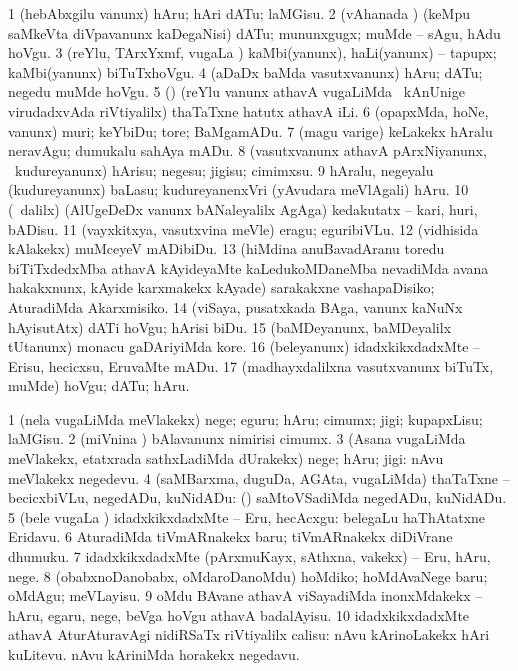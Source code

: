 \bentry
{}
\gl{\sakirx}
\bmng
\bnum
\num{1} (hebAbxgilu \mo vanunx) hAru; hAri dATu; laMGisu. 
\num{2} (vAhanada \vi) (keMpu saMkeVta diVpavanunx kaDegaNisi) dATu; mununxgugx; muMde -- sAgu, hAdu hoVgu. 
\num{3} (reYlu, TArxYxmf, \mo vugaLa \vi) kaMbi(yanunx), haLi(yanunx) -- tapupx; kaMbi(yanunx) biTuTxhoVgu. 
\num{4} (aDaDx baMda vasutxvanunx) hAru; dATu; negedu muMde hoVgu. 
\num{5} (\ame) (reYlu \mo vanunx athavA \mo vugaLiMda \kanmu\ kAnUnige virudadxvAda riVtiyalilx) thaTaTxne hatutx athavA iLi. 
\num{6} (opapxMda, hoNe, \mo vanunx) muri; keYbiDu; tore; BaMgamADu. 
\num{7} (magu \mo varige) keLakekx hAralu neravAgu; dumukalu sahAya mADu. 
\num{8} (vasutxvanunx athavA pArxNiyanunx, \kanmu\ kudureyanunx) hArisu; negesu; jigisu; cimimxsu. 
\num{9} hAralu, negeyalu (kudureyanunx) baLasu; kudureyanenxVri (yAvudara meVlAgali) hAru. 
\num{10} (\sA\ \BUkaq dalilx) (AlUgeDeDx \mo vanunx bANaleyalilx AgAga) kedakutatx -- kari, huri, bADisu. 
\num{11} (vayxkitxya, vasutxvina meVle) eragu; eguribiVLu. 
\num{12} (vidhisida kAlakekx) muMceyeV mADibiDu. 
\num{13} (hiMdina anuBavadAranu toredu biTiTxdedxMba athavA kAyideyaMte kaLedukoMDaneMba nevadiMda avana hakakxnunx, kAyide karxmakekx kAyade) sarakakxne vashapaDisiko; AturadiMda Akarxmisiko. 
\num{14} (viSaya, pusatxkada BAga, \mo vanunx kaNuNx hAyisutAtx) dATi hoVgu; hArisi biDu. 
\num{15} (baMDeyanunx, baMDeyalilx tUtanunx) monacu gaDAriyiMda kore. 
\num{16} (beleyanunx) idadxkikxdadxMte -- Erisu, hecicxsu, EruvaMte mADu. 
\num{17} (madhayxdalilxna vasutxvanunx biTuTx, muMde) hoVgu; dATu; hAru. 
\enum
\emng

\noindent
\gl{\akirx}
\bmng
\bnum
\num{1} (nela \mo vugaLiMda meVlakekx) nege; eguru; hAru; cimumx; jigi; kupapxLisu; laMGisu. 
\num{2} (miVnina \vi) bAlavanunx nimirisi cimumx. 
\num{3} (Asana \mo vugaLiMda meVlakekx, etatxrada sathxLadiMda dUrakekx) nege; hAru; jigi:  nAvu meVlakekx negedevu. 
\num{4} (saMBarxma, duguDa, AGAta, \mo vugaLiMda) thaTaTxne -- becicxbiVLu, negedADu, kuNidADu: (\kanmu)  saMtoVSadiMda negedADu, kuNidADu. 
\num{5} (bele \mo vugaLa \vi) idadxkikxdadxMte -- Eru, hecAcxgu:  belegaLu haThAtatxne Eridavu. 
\num{6} AturadiMda tiVmARnakekx baru; tiVmARnakekx diDiVrane dhumuku. 
\num{7} idadxkikxdadxMte (pArxmuKayx, sAthxna, \mo vakekx) -- Eru, hAru, nege. 
\num{8} (obabxnoDanobabx, oMdaroDanoMdu) hoMdiko; hoMdAvaNege baru; oMdAgu; meVLayisu. 
\num{9} oMdu BAvane athavA viSayadiMda inonxMdakekx -- hAru, egaru, nege, beVga hoVgu athavA badalAyisu. 
\num{10} idadxkikxdadxMte athavA AturAturavAgi nidiRSaTx riVtiyalilx calisu:  nAvu kArinoLakekx hAri kuLitevu.  nAvu kAriniMda horakekx negedavu. 
\enum
\emng

